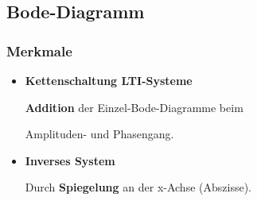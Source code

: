 \subsection{Bode-Diagramm}
 \subsubsection{Merkmale}
 \begin{itemize}
 	\item \textbf{Kettenschaltung LTI-Systeme}
 	
 	\textbf{Addition} der Einzel-Bode-Diagramme beim \par Amplituden- und Phasengang. 
 	
 	\item \textbf{Inverses System}
 	
 	Durch \textbf{Spiegelung} an der x-Achse (Abszisse). 
 \end{itemize}
 
